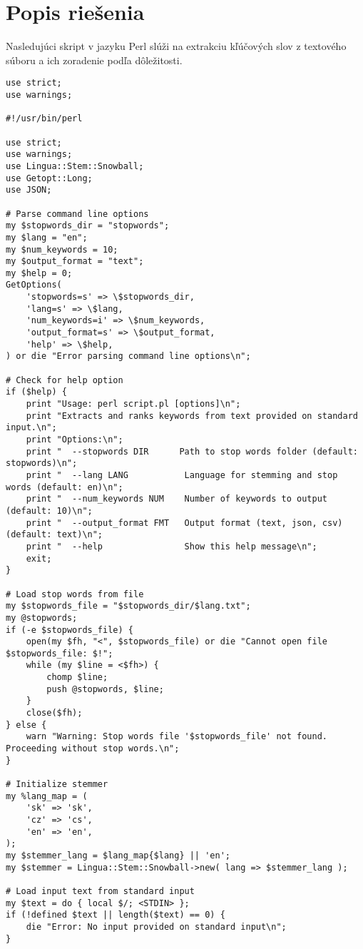 \documentclass{article}
\begin{document}
\section{Popis riešenia}

Nasledujúci skript v jazyku Perl slúži na extrakciu kľúčových slov z textového súboru a ich zoradenie podľa dôležitosti.

\begin{lstlisting}
use strict;
use warnings;

#!/usr/bin/perl

use strict;
use warnings;
use Lingua::Stem::Snowball;
use Getopt::Long;
use JSON;

# Parse command line options
my $stopwords_dir = "stopwords";
my $lang = "en";
my $num_keywords = 10;
my $output_format = "text";
my $help = 0;
GetOptions(
    'stopwords=s' => \$stopwords_dir,
    'lang=s' => \$lang,
    'num_keywords=i' => \$num_keywords,
    'output_format=s' => \$output_format,
    'help' => \$help,
) or die "Error parsing command line options\n";

# Check for help option
if ($help) {
    print "Usage: perl script.pl [options]\n";
    print "Extracts and ranks keywords from text provided on standard input.\n";
    print "Options:\n";
    print "  --stopwords DIR      Path to stop words folder (default: stopwords)\n";
    print "  --lang LANG           Language for stemming and stop words (default: en)\n";
    print "  --num_keywords NUM    Number of keywords to output (default: 10)\n";
    print "  --output_format FMT   Output format (text, json, csv) (default: text)\n";
    print "  --help                Show this help message\n";
    exit;
}

# Load stop words from file
my $stopwords_file = "$stopwords_dir/$lang.txt";
my @stopwords;
if (-e $stopwords_file) {
    open(my $fh, "<", $stopwords_file) or die "Cannot open file $stopwords_file: $!";
    while (my $line = <$fh>) {
        chomp $line;
        push @stopwords, $line;
    }
    close($fh);
} else {
    warn "Warning: Stop words file '$stopwords_file' not found. Proceeding without stop words.\n";
}

# Initialize stemmer
my %lang_map = (
    'sk' => 'sk',
    'cz' => 'cs',
    'en' => 'en',
);
my $stemmer_lang = $lang_map{$lang} || 'en';
my $stemmer = Lingua::Stem::Snowball->new( lang => $stemmer_lang );

# Load input text from standard input
my $text = do { local $/; <STDIN> };
if (!defined $text || length($text) == 0) {
    die "Error: No input provided on standard input\n";
}


\end{lstlisting}
\end{document}
